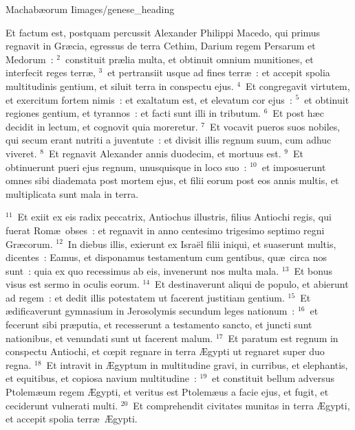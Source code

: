 {Machabæorum I}{images/genese_heading}


\lettrine[lines=10,image=true,loversize=0.05,lraise=-0.03]{E}{}t factum est, postquam percussit Alexander Philippi Macedo, qui primus regnavit in Gr\ae cia, egressus de terra Cethim, Darium regem Persarum et Medorum~:
${}^{2}$~constituit pr\ae lia multa, et obtinuit omnium munitiones, et interfecit reges terr\ae ,
${}^{3}$~et pertransiit usque ad fines terr\ae~: et accepit spolia multitudinis gentium, et siluit terra in conspectu ejus.
${}^{4}$~Et congregavit virtutem, et exercitum fortem nimis~: et exaltatum est, et elevatum cor ejus~:
${}^{5}$~et obtinuit regiones gentium, et tyrannos~: et facti sunt illi in tributum.
${}^{6}$~Et post h\ae c decidit in lectum, et cognovit quia moreretur.
${}^{7}$~Et vocavit pueros suos nobiles, qui secum erant nutriti a juventute~: et divisit illis regnum suum, cum adhuc viveret.
${}^{8}$~Et regnavit Alexander annis duodecim, et mortuus est.
${}^{9}$~Et obtinuerunt pueri ejus regnum, unusquisque in loco suo~:
${}^{10}$~et imposuerunt omnes sibi diademata post mortem ejus, et filii eorum post eos annis multis, et multiplicata sunt mala in terra.


${}^{11}$~Et exiit ex eis radix peccatrix, Antiochus illustris, filius Antiochi regis, qui fuerat Rom\ae\ obses~: et regnavit in anno centesimo trigesimo septimo regni Gr\ae corum.
${}^{12}$~In diebus illis, exierunt ex Isra\"el filii iniqui, et suaserunt multis, dicentes~: Eamus, et disponamus testamentum cum gentibus, qu\ae\ circa nos sunt~: quia ex quo recessimus ab eis, invenerunt nos multa mala.
${}^{13}$~Et bonus visus est sermo in oculis eorum.
${}^{14}$~Et destinaverunt aliqui de populo, et abierunt ad regem~: et dedit illis potestatem ut facerent justitiam gentium.
${}^{15}$~Et \ae dificaverunt gymnasium in Jerosolymis secundum leges nationum~:
${}^{16}$~et fecerunt sibi pr\ae putia, et recesserunt a testamento sancto, et juncti sunt nationibus, et venundati sunt ut facerent malum.
${}^{17}$~Et paratum est regnum in conspectu Antiochi, et cœpit regnare in terra \AE gypti ut regnaret super duo regna.
${}^{18}$~Et intravit in \AE gyptum in multitudine gravi, in curribus, et elephantis, et equitibus, et copiosa navium multitudine~:
${}^{19}$~et constituit bellum adversus Ptolem\ae um regem \AE gypti, et veritus est Ptolem\ae us a facie ejus, et fugit, et ceciderunt vulnerati multi.
${}^{20}$~Et comprehendit civitates munitas in terra \AE gypti, et accepit spolia terr\ae\ \AE gypti.



